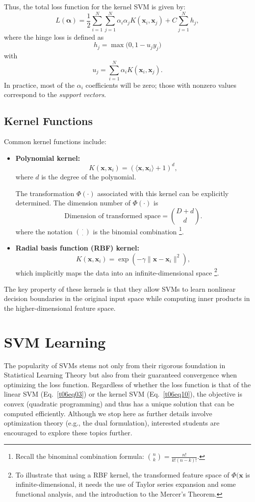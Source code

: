 \documentclass[12pt]{article}
\begin{document}
Thus, the total loss function for the kernel SVM is given by:
\begin{equation}
L(\boldsymbol\alpha) = \frac{1}{2} \sum_{i=1}^N \sum_{j=1}^N \alpha_i \alpha_j K(\bm{x}_i, \bm{x}_j) + C \sum_{j=1}^N h_j,
\label{t06eq10}
\end{equation}
where the hinge loss is defined as
\[
h_j = \max\big(0, 1 - u_j y_j\big)
\]
with 
\[
u_j = \sum_{i=1}^N \alpha_i K(\bm{x}_i, \bm{x}_j).
\]
In practice, most of the $\alpha_i$ coefficients will be zero; those with nonzero values correspond to the \textit{support vectors}.

\subsection{Kernel Functions}
Common kernel functions include:
\begin{itemize}
    \item \textbf{Polynomial kernel:}
    \[
    K(\bm{x}, \bm{x}_i) = (\langle \bm{x}, \bm{x}_i \rangle + 1)^d,
    \]
    where $d$ is the degree of the polynomial. 
    
    The transformation $\Phi(\cdot)$ associated with this kernel can be explicitly determined. The dimension number of $\Phi(\cdot)$ is
    \[
    \text{Dimension of transformed space} = \binom{D+d}{d}.
    \]
    where the notation $\binom{\cdot}{\cdot}$ is the binomial combination \footnote{Recall the binominal combination formula:  $\binom{n}{k} = \frac{n!}{k!(n-k)!}$.}.
    \item \textbf{Radial basis function (RBF) kernel:}
    \[
    K(\bm{x}, \bm{x}_i) = \exp(-\gamma \|\bm{x} - \bm{x}_i\|^2),
    \]
    which implicitly maps the data into an infinite-dimensional space \footnote{To illustrate that using a RBF kernel, the transformed feature space of $\Phi(\bm{x}$ is infinite-dimensional, it needs the use of Taylor series expansion and some functional analysis, and the introduction to the Mercer’s Theorem.}.
\end{itemize}
The key property of these kernels is that they allow SVMs to learn nonlinear decision boundaries in the original input space while computing inner products in the higher-dimensional feature space.

\section{SVM Learning}
The popularity of SVMs stems not only from their rigorous foundation in Statistical Learning Theory but also from their guaranteed convergence when optimizing the loss function. Regardless of whether the loss function is that of the linear SVM (Eq.~\ref{t06eq03}) or the kernel SVM (Eq.~\ref{t06eq10}), the objective is convex (quadratic programming) and thus has a unique solution that can be computed efficiently. Although we stop here as further details involve optimization theory (e.g., the dual formulation), interested students are encouraged to explore these topics further.
\end{document}
